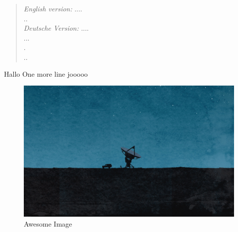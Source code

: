 \documentclass[11pt,a4paper,oneside]{report}
\begin{document}
\begin{abstract}
\noindent\emph{English version:}\newline\newline
\noindent
....\\
..\\

\vspace{1cm}
\noindent\emph{Deutsche Version:}\newline\newline
\noindent
....\\
...\\
.\\
..\\

\end{abstract}

\tableofcontents

\listoffigures

\listoftables


Hallo %
One more line %
jooooo \cite{presContainerDockerSec}

\begin{figure}[h] %
    \centering
    \includegraphics[width=1.0\textwidth]{./images/image.jpg}
    \caption{Awesome Image}
    \label{fig:awesome_image}
\end{figure}
\end{document}
